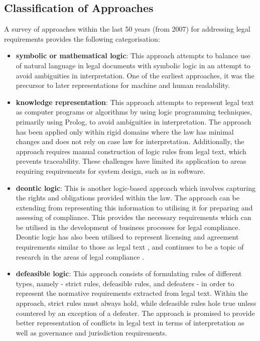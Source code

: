 \subsection{Classification of Approaches}\label{sec:sota:models:approaches}
A survey of approaches within the last 50 years (from 2007) for addressing legal requirements \cite{otto_addressing_2007} provides the following categorisation:
\begin{itemize}
    \item \textbf{symbolic or mathematical logic}:  This approach attempts to balance use of natural language in legal documents with symbolic logic in an attempt to avoid ambiguities in interpretation. One of the earliest approaches, it was the precursor to later representations for machine and human readability.
    \item \textbf{knowledge representation}: This approach attempts to represent legal text as computer programs or algorithms by using logic programming techniques, primarily using Prolog, to avoid ambiguities in interpretation. The approach has been applied only within rigid domains where the law has minimal changes and does not rely on case law for interpretation. Additionally, the approach requires manual construction of logic rules from legal text, which prevents traceability. These challenges have limited its application to areas requiring requirements for system design, such as in software.
	\item \textbf{deontic logic}: This is another logic-based approach which involves capturing the rights and obligations provided within the law. The approach can be extending from representing this information to utilising it for preparing and assessing of compliance. This provides the necessary requirements which can be utilised in the development of business processes for legal compliance. Deontic logic has also been utilised to represent licensing and agreement requirements similar to those as legal text \cite{pellegrini_genealogy_2018}, and continues to be a topic of research in the areas of legal compliance \cite{palmirani_pronto:_2018,agarwal_legislative_2018,vos_odrl_2019}.
	\item \textbf{defeasible logic}: This approach consists of formulating rules of different types, namely - strict rules, defeasible rules, and defeaters - in order to represent the normative requirements extracted from legal text. Within the approach, strict rules must always hold, while defeasible rules hole true unless countered by an exception of a defeater. The approach is promised to provide better representation of conflicts in legal text in terms of interpretation as well as governance and jurisdiction requirements.

\end{itemize}

